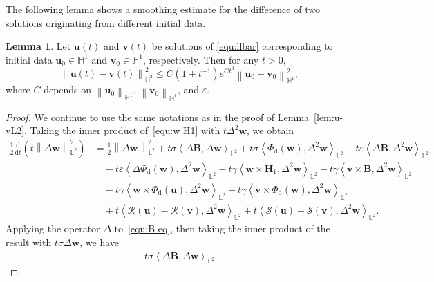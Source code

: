 \documentclass[11pt, reqno]{amsart}
\theoremstyle{definition}
\newtheorem{lemma}[theorem]{Lemma}
\numberwithin{equation}{section}
\newcommand{\bff}{\boldsymbol}
\newcommand{\bb}{\mathbb}
\newcommand{\ddt}{\frac{\mathrm{d}}{\mathrm{d}t}}
\newcommand{\norm}[2]{\left\|{#1}\right\|_{#2}}
\newcommand{\inpro}[2]{\left\langle#1,#2\right\rangle}
\begin{document}
The following lemma shows a smoothing estimate for the difference of two solutions originating from different initial data.

\begin{lemma}\label{lem:smoo}
Let $\bff{u}(t)$ and $\bff{v}(t)$ be solutions of \eqref{equ:llbar} corresponding to initial data $\bff{u}_0\in \bb{H}^1$ and $\bff{v}_0\in \bb{H}^1$, respectively. Then for any $t>0$,
\begin{equation*}
    \norm{\bff{u}(t)-\bff{v}(t)}{\bb{H}^2}^2
    \leq 
    C(1+t^{-1}) e^{Ct^3} \norm{\bff{u}_0-\bff{v}_0}{\bb{H}^1}^2,
\end{equation*}
where $C$ depends on $\norm{\bff{u}_0}{\bb{H}^1}$, $\norm{\bff{v}_0}{\bb{H}^1}$, and $\varepsilon$.
\end{lemma}

\begin{proof}
We continue to use the same notations as in the proof of Lemma~\ref{lem:u-vL2}. Taking the inner product of~\eqref{equ:w H1} with $t\Delta^2 \bff{w}$, we obtain
\begin{align}\label{equ:12t Delta2w}
    \frac12 \ddt \left(t \norm{\Delta \bff{w}}{\bb{L}^2}^2 \right)
    &=
    \frac12 \norm{\Delta \bff{w}}{\bb{L}^2}^2
    +
    t\sigma \inpro{\Delta \bff{B}}{\Delta \bff{w}}_{\bb{L}^2}
    +
    t\sigma \inpro{\Phi_{\mathrm{d}} (\bff{w})}{\Delta^2 \bff{w}}_{\bb{L}^2}
    -
    t\varepsilon \inpro{\Delta \bff{B}}{\Delta^2 \bff{w}}_{\bb{L}^2}
    \nonumber \\
    &\quad
    -
    t\varepsilon \inpro{\Delta \Phi_{\mathrm{d}}(\bff{w})}{\Delta^2 \bff{w}}_{\bb{L}^2}
    -
    t\gamma \inpro{\bff{w}\times \bff{H}_1}{\Delta^2 \bff{w}}_{\bb{L}^2}
    -
    t\gamma \inpro{\bff{v}\times \bff{B}}{\Delta^2 \bff{w}}_{\bb{L}^2}
    \nonumber \\
    &\quad
    -
    t\gamma \inpro{\bff{w}\times \Phi_{\mathrm{d}}(\bff{u})}{\Delta^2 \bff{w}}_{\bb{L}^2}
    -
    t\gamma \inpro{\bff{v} \times \Phi_{\mathrm{d}}(\bff{w})}{\Delta^2 \bff{w}}_{\bb{L}^2}
    \nonumber \\
    &\quad
    +
    t \inpro{\mathcal{R}(\bff{u})-\mathcal{R}(\bff{v})}{\Delta^2 \bff{w}}_{\bb{L}^2}
    +
    t \inpro{\mathcal{S}(\bff{u})-\mathcal{S}(\bff{v})}{\Delta^2 \bff{w}}_{\bb{L}^2}.
\end{align}
Applying the operator $\Delta$ to~\eqref{equ:B eq}, then taking the inner product of the result with $t\sigma\Delta \bff{w}$, we have
\begin{align}\label{equ:t sigma Delta B}
    t\sigma\inpro{\Delta \bff{B}}{\Delta \bff{w}}_{\bb{L}^2}

\end{align}
\end{proof}
\end{document}
